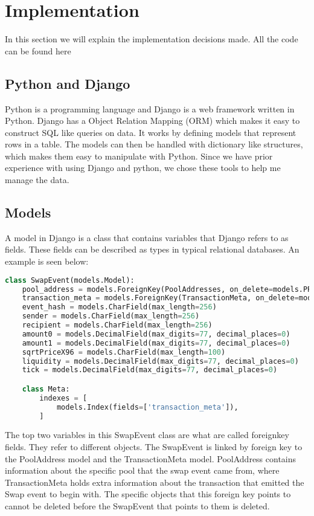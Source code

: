 \section{Implementation}

In this section we will explain the implementation decisions made. All the code can be found here \cite{githubrepo}

\subsection{Python and Django}

Python is a programming language and Django is a web framework written in Python. Django has a Object Relation Mapping (ORM) which makes it easy to construct SQL like queries on data. It works by defining models that represent rows in a table. The models can then be handled with dictionary like structures, which makes them easy to manipulate with Python. Since we have prior experience with using Django and python, we chose these tools to help me manage the data. 

\subsection{Models}
A model in Django is a class that contains variables that Django refers to as fields. These fields can be described as types in typical relational databases. An example is seen below:

\begin{lstlisting}[language=python]
class SwapEvent(models.Model):
    pool_address = models.ForeignKey(PoolAddresses, on_delete=models.PROTECT)
    transaction_meta = models.ForeignKey(TransactionMeta, on_delete=models.PROTECT, null=True, default=None)
    event_hash = models.CharField(max_length=256)
    sender = models.CharField(max_length=256)
    recipient = models.CharField(max_length=256)
    amount0 = models.DecimalField(max_digits=77, decimal_places=0)
    amount1 = models.DecimalField(max_digits=77, decimal_places=0)
    sqrtPriceX96 = models.CharField(max_length=100)
    liquidity = models.DecimalField(max_digits=77, decimal_places=0)
    tick = models.DecimalField(max_digits=77, decimal_places=0)

    class Meta:
        indexes = [
            models.Index(fields=['transaction_meta']),
        ]
\end{lstlisting}

The top two variables in this SwapEvent class are what are called foreignkey fields. They refer to different objects. The SwapEvent is linked by foreign key to the PoolAddress model and the TransactionMeta model. PoolAddress contains information about the specific pool that the swap event came from, where TransactionMeta holds extra information about the transaction that emitted the Swap event to begin with. The specific objects that this foreign key points to cannot be deleted before the SwapEvent that points to them is deleted.

